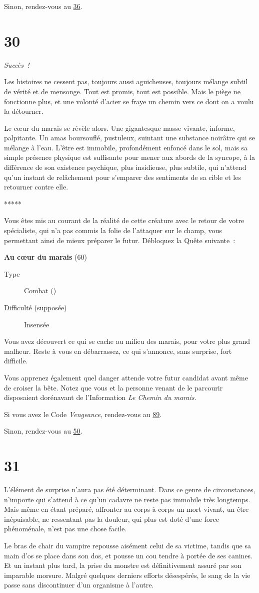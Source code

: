 \documentclass{report}
\newcommand{\gsection}[1]{
    \section{#1}
    \label{section-#1}
}
\newcommand{\glink}[1]{\hyperref[section-#1]{#1}}
\newcommand{\quest}[5]{
    \begin{mdframed}[innertopmargin=0.5cm,innerbottommargin=0.5cm]
        \begin{center}
            \textbf{#1} (#2)
        \end{center}
        \begin{description}
            \item[Type] #3
            \item[Difficulté (supposée)] #4
        \end{description}
        #5
    \end{mdframed}
}
\newcommand{\ellipse}{
    \begin{center}
        *****
    \end{center}
}
\newcommand{\success}{
    \emph{Succès !}
}
\begin{document}
Sinon, rendez-vous au \glink{36}.

\gsection{30}

\success

Les histoires ne cessent pas, toujours aussi aguicheuses, toujours mélange subtil de vérité et de mensonge. Tout est promis, tout est possible. Mais le piège ne fonctionne plus, et une volonté d'acier se fraye un chemin vers ce dont on a voulu la détourner.

Le cœur du marais se révèle alors. Une gigantesque masse vivante, informe, palpitante. Un amas boursouflé, pustuleux, suintant une substance noirâtre qui se mélange à l'eau. L'être est immobile, profondément enfoncé dans le sol, mais sa simple présence physique est suffisante pour mener aux abords de la syncope, à la différence de son existence psychique, plus insidieuse, plus subtile, qui n'attend qu'un instant de relâchement pour s'emparer des sentiments de sa cible et les retourner contre elle.

\ellipse

Vous êtes mis au courant de la réalité de cette créature avec le retour de votre spécialiste, qui n'a pas commis la folie de l'attaquer sur le champ, vous permettant ainsi de mieux préparer le futur. Débloquez la Quête suivante :

\quest{Au cœur du marais}{60}{Combat (\caduceus)}{Insensée}{
Vous avez découvert ce qui se cache au milieu des marais, pour votre plus grand malheur. Reste à vous en débarrassez, ce qui s'annonce, sans surprise, fort difficile.
}

Vous apprenez également quel danger attende votre futur candidat avant même de croiser la bête. Notez que vous et la personne venant de le parcourir disposaient dorénavant de l'Information \emph{Le Chemin du marais}.

Si vous avez le Code \emph{Vengeance}, rendez-vous au \glink{89}.

Sinon, rendez-vous au \glink{50}.

\gsection{31}

L'élément de surprise n'aura pas été déterminant. Dans ce genre de circonstances, n'importe qui s'attend à ce qu'un cadavre ne reste pas immobile très longtemps. Mais même en étant préparé, affronter au corps-à-corps un mort-vivant, un être inépuisable, ne ressentant pas la douleur, qui plus est doté d'une force phénoménale, n'est pas une chose facile.

Le bras de chair du  vampire repousse aisément celui de sa victime, tandis que sa main d'os se place dans son dos, et pousse un cou tendre à portée de ses canines. Et un instant plus tard, la prise du monstre est définitivement assuré par son imparable morsure. Malgré quelques derniers efforts désespérés, le sang de la vie passe sans discontinuer d'un organisme à l'autre.
\end{document}
